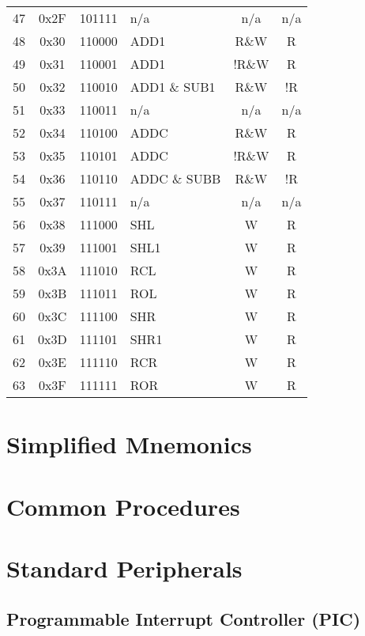 \documentclass[oneside, a4paper]{memoir}
\begin{document}
\begin{center}
\begin{longtable}{ccclcc}
47 & 0x2F & 101111 & n/a             & n/a   & n/a \\
48 & 0x30 & 110000 & ADD1            & R\&W  & R   \\
49 & 0x31 & 110001 & ADD1            & !R\&W & R   \\
50 & 0x32 & 110010 & ADD1  \& SUB1   & R\&W  & !R  \\
51 & 0x33 & 110011 & n/a             & n/a   & n/a \\
52 & 0x34 & 110100 & ADDC            & R\&W  & R   \\
53 & 0x35 & 110101 & ADDC            & !R\&W & R   \\
54 & 0x36 & 110110 & ADDC  \& SUBB   & R\&W  & !R  \\
55 & 0x37 & 110111 & n/a             & n/a   & n/a \\
56 & 0x38 & 111000 & SHL             & W     & R   \\
57 & 0x39 & 111001 & SHL1            & W     & R   \\
58 & 0x3A & 111010 & RCL             & W     & R   \\
59 & 0x3B & 111011 & ROL             & W     & R   \\
60 & 0x3C & 111100 & SHR             & W     & R   \\
61 & 0x3D & 111101 & SHR1            & W     & R   \\
62 & 0x3E & 111110 & RCR             & W     & R   \\
63 & 0x3F & 111111 & ROR             & W     & R   \\
\end{longtable}
\end{center}

\chapter{Simplified Mnemonics}

\chapter{Common Procedures}

\chapter{Standard Peripherals}
\section{Programmable Interrupt Controller (PIC)}
\end{document}
